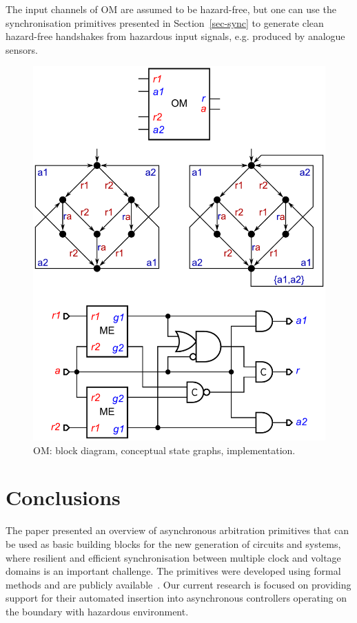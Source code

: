 \documentclass[conference]{IEEEtran}
\begin{document}
The input channels of \textsf{OM} are assumed to be hazard-free, but one can use the
synchronisation primitives presented in Section~\ref{sec-sync} to generate clean hazard-free
handshakes from hazardous input signals, e.g. produced by analogue sensors.

\begin{figure}
\begin{center}
    \vspace{-1mm}
    \includegraphics[scale=0.32]{fig/OM.pdf}
    \caption{\textsf{OM}: block diagram, conceptual state graphs,
    implementation.}
    \label{fig:om}
    \vspace{-6.5mm}
\end{center}
\end{figure}

\section{Conclusions}

The paper presented an overview of asynchronous arbitration primitives that can
be used as basic building blocks for the new generation of circuits and systems,
where resilient and efficient synchronisation between multiple clock and voltage
domains is an important challenge.
The primitives were developed using formal methods and are publicly
available~\cite{Arbitration_primitives_github}. Our current research is focused
on providing support for their automated insertion into asynchronous controllers
operating on the boundary with hazardous environment.
\end{document}
